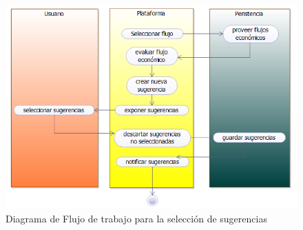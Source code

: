 \begin{figure}[H]
	\centering
	\includegraphics[width=1\linewidth]{parte2/imgs/DiagramaDeFlujoDeTrabajo/DiagramaDeFlujo2}
	\caption{Diagrama de Flujo de trabajo para la selección de sugerencias}
	\label{fig:diagramaSeleccionarSugerencias}
\end{figure}